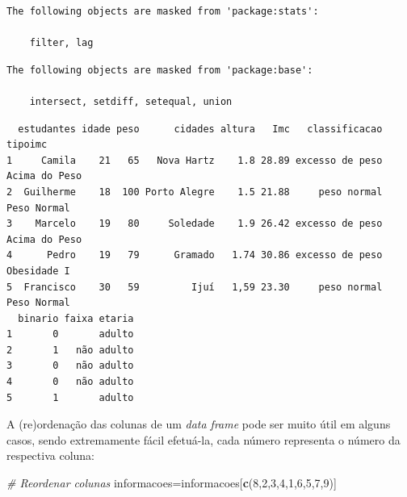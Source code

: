 \documentclass[12pt,brazil,]{book}
\newenvironment{Shaded}{\begin{snugshade}}{\end{snugshade}}
\newcommand{\CommentTok}[1]{\textcolor[rgb]{0.56,0.35,0.01}{\textit{#1}}}
\newcommand{\DecValTok}[1]{\textcolor[rgb]{0.00,0.00,0.81}{#1}}
\newcommand{\KeywordTok}[1]{\textcolor[rgb]{0.13,0.29,0.53}{\textbf{#1}}}
\newcommand{\NormalTok}[1]{#1}
\newcommand{\OperatorTok}[1]{\textcolor[rgb]{0.81,0.36,0.00}{\textbf{#1}}}
\newcommand{\StringTok}[1]{\textcolor[rgb]{0.31,0.60,0.02}{#1}}
\begin{document}
\begin{verbatim}
The following objects are masked from 'package:stats':

    filter, lag
\end{verbatim}

\begin{verbatim}
The following objects are masked from 'package:base':

    intersect, setdiff, setequal, union
\end{verbatim}

\begin{Shaded}
\end{Shaded}

\begin{verbatim}
  estudantes idade peso      cidades altura   Imc   classificacao       tipoimc
1     Camila    21   65   Nova Hartz    1.8 28.89 excesso de peso Acima do Peso
2  Guilherme    18  100 Porto Alegre    1.5 21.88     peso normal   Peso Normal
3    Marcelo    19   80     Soledade    1.9 26.42 excesso de peso Acima do Peso
4      Pedro    19   79      Gramado   1.74 30.86 excesso de peso   Obesidade I
5  Francisco    30   59         Ijuí   1,59 23.30     peso normal   Peso Normal
  binario faixa etaria
1       0       adulto
2       1   não adulto
3       0   não adulto
4       0   não adulto
5       1       adulto
\end{verbatim}

A (re)ordenação das colunas de um \emph{data frame} pode ser muito útil
em alguns casos, sendo extremamente fácil efetuá-la, cada número
representa o número da respectiva coluna:

\begin{Shaded}
\begin{Highlighting}[]
\CommentTok{# Reordenar colunas}
\NormalTok{informacoes=informacoes[}\KeywordTok{c}\NormalTok{(}\DecValTok{8}\NormalTok{,}\DecValTok{2}\NormalTok{,}\DecValTok{3}\NormalTok{,}\DecValTok{4}\NormalTok{,}\DecValTok{1}\NormalTok{,}\DecValTok{6}\NormalTok{,}\DecValTok{5}\NormalTok{,}\DecValTok{7}\NormalTok{,}\DecValTok{9}\NormalTok{)]}
\end{Highlighting}
\end{Shaded}
\end{document}
